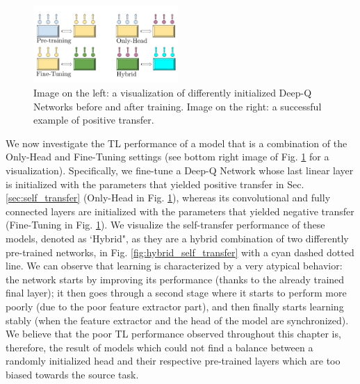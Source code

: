 \begin{figure}[ht]
\begin{minipage}{0.5\textwidth}
	\centering
\includegraphics[width=5.5cm]{./Images/Chapter08/new_networks_2.pdf}
\end{minipage}%
\begin{minipage}{0.5\textwidth}
	\centering
	
\end{minipage}
	\caption{Image on the left: a visualization of differently initialized Deep-Q Networks before and after training. Image on the right: a successful example of positive transfer.}
\label{fig:networks}
\end{figure}

We now investigate the TL performance of a model that is a combination of the Only-Head and Fine-Tuning settings (see bottom right image of Fig. \ref{fig:networks} for a visualization). Specifically, we fine-tune a Deep-Q Network whose last linear layer is initialized with the parameters that yielded positive transfer in Sec. \ref{sec:self_transfer} (Only-Head in Fig. \ref{fig:networks}), whereas its convolutional and fully connected layers are initialized with the parameters that yielded negative transfer (Fine-Tuning in Fig. \ref{fig:networks}). We visualize the self-transfer performance of these models, denoted as `Hybrid", as they are a hybrid combination of two differently pre-trained networks, in Fig. \ref{fig:hybrid_self_transfer} with a cyan dashed dotted line. We can observe that learning is characterized by a very atypical behavior: the network starts by improving its performance (thanks to the already trained final layer); it then goes through a second stage where it starts to perform more poorly (due to the poor feature extractor part), and then finally starts learning stably (when the feature extractor and the head of the model are synchronized). We believe that the poor TL performance observed throughout this chapter is, therefore, the result of models which could not find a balance between a randomly initialized head and their respective pre-trained layers which are too biased towards the source task.   

